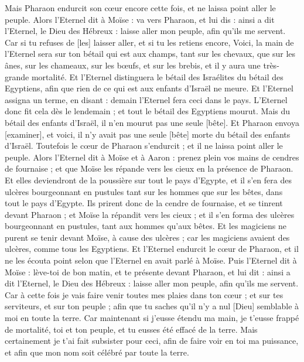 \begin{multicols}{2}
Mais Pharaon endurcit son cœur encore cette fois, et ne laissa point aller le peuple.
\VerseOne{}Alors l'Eternel dit à Moïse : va vers Pharaon, et lui dis : ainsi a dit l'Eternel, le Dieu des Hébreux : laisse aller mon peuple, afin qu'ils me servent.
Car si tu refuses de [les] laisser aller, et si tu les retiens encore,
Voici, la main de l'Eternel sera sur ton bétail qui est aux champs, tant sur les chevaux, que sur les ânes, sur les chameaux, sur les bœufs, et sur les brebis, et il y aura une très-grande mortalité.
Et l'Eternel distinguera le bétail des Israélites du bétail des Egyptiens, afin que rien de ce qui est aux enfants d'Israël ne meure.
Et l'Eternel assigna un terme, en disant : demain l'Eternel fera ceci dans le pays.
L'Eternel donc fit cela dès le lendemain ; et tout le bétail des Egyptiens mourut. Mais du bétail des enfants d'Israël, il n'en mourut pas une seule [bête].
Et Pharaon envoya [examiner], et voici, il n'y avait pas une seule [bête] morte du bétail des enfants d'Israël. Toutefois le cœur de Pharaon s'endurcit ; et il ne laissa point aller le peuple.
Alors l'Eternel dit à Moïse et à Aaron : prenez plein vos mains de cendres de fournaise ; et que Moïse les répande vers les cieux en la présence de Pharaon.
Et elles deviendront de la poussière sur tout le pays d'Egypte, et il s'en fera des ulcères bourgeonnant en pustules tant sur les hommes que sur les bêtes, dans tout le pays d'Egypte.
Ils prirent donc de la cendre de fournaise, et se tinrent devant Pharaon ; et Moïse la répandit vers les cieux ; et il s'en forma des ulcères bourgeonnant en pustules, tant aux hommes qu'aux bêtes.
Et les magiciens ne purent se tenir devant Moïse, à cause des ulcères ; car les magiciens avaient des ulcères, comme tous les Egyptiens.
Et l'Eternel endurcit le cœur de Pharaon, et il ne les écouta point selon que l'Eternel en avait parlé à Moïse.
Puis l'Eternel dit à Moïse : lève-toi de bon matin, et te présente devant Pharaon, et lui dit : ainsi a dit l'Eternel, le Dieu des Hébreux : laisse aller mon peuple, afin qu'ils me servent.
Car à cette fois je vais faire venir toutes mes plaies dans ton cœur ; et sur tes serviteurs, et sur ton peuple ; afin que tu saches qu'il n'y a nul [Dieu] semblable à moi en toute la terre.
Car maintenant si j'eusse étendu ma main, je t'eusse frappé de mortalité, toi et ton peuple, et tu eusses été effacé de la terre.
Mais certainement je t'ai fait subsister pour ceci, afin de faire voir en toi ma puissance, et afin que mon nom soit célébré par toute la terre.

\end{multicols}
